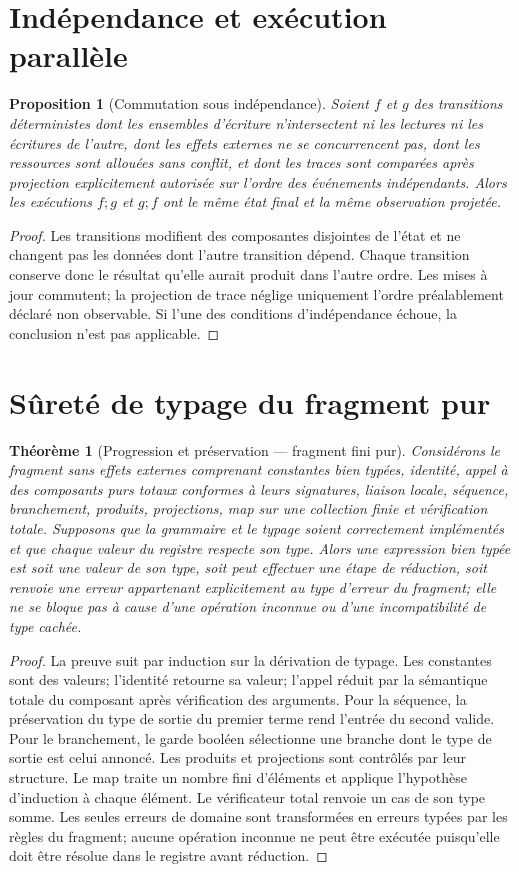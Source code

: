 \documentclass[11pt,a4paper,openany]{book}
\theoremstyle{definition}
\theoremstyle{plain}
\newtheorem{theorem}[definition]{Théorème}
\newtheorem{proposition}[definition]{Proposition}
\theoremstyle{remark}
\begin{document}
\section{Indépendance et exécution parallèle}
\begin{proposition}[Commutation sous indépendance]
Soient $f$ et $g$ des transitions déterministes dont les ensembles d'écriture n'intersectent ni les lectures ni les écritures de l'autre, dont les effets externes ne se concurrencent pas, dont les ressources sont allouées sans conflit, et dont les traces sont comparées après projection explicitement autorisée sur l'ordre des événements indépendants. Alors les exécutions $f;g$ et $g;f$ ont le même état final et la même observation projetée.
\end{proposition}
\begin{proof}
Les transitions modifient des composantes disjointes de l'état et ne changent pas les données dont l'autre transition dépend. Chaque transition conserve donc le résultat qu'elle aurait produit dans l'autre ordre. Les mises à jour commutent; la projection de trace néglige uniquement l'ordre préalablement déclaré non observable. Si l'une des conditions d'indépendance échoue, la conclusion n'est pas applicable.
\end{proof}

\section{Sûreté de typage du fragment pur}
\begin{theorem}[Progression et préservation — fragment fini pur]
Considérons le fragment sans effets externes comprenant constantes bien typées, identité, appel à des composants purs totaux conformes à leurs signatures, liaison locale, séquence, branchement, produits, projections, map sur une collection finie et vérification totale. Supposons que la grammaire et le typage soient correctement implémentés et que chaque valeur du registre respecte son type. Alors une expression bien typée est soit une valeur de son type, soit peut effectuer une étape de réduction, soit renvoie une erreur appartenant explicitement au type d'erreur du fragment; elle ne se bloque pas à cause d'une opération inconnue ou d'une incompatibilité de type cachée.
\end{theorem}
\begin{proof}
La preuve suit par induction sur la dérivation de typage. Les constantes sont des valeurs; l'identité retourne sa valeur; l'appel réduit par la sémantique totale du composant après vérification des arguments. Pour la séquence, la préservation du type de sortie du premier terme rend l'entrée du second valide. Pour le branchement, le garde booléen sélectionne une branche dont le type de sortie est celui annoncé. Les produits et projections sont contrôlés par leur structure. Le map traite un nombre fini d'éléments et applique l'hypothèse d'induction à chaque élément. Le vérificateur total renvoie un cas de son type somme. Les seules erreurs de domaine sont transformées en erreurs typées par les règles du fragment; aucune opération inconnue ne peut être exécutée puisqu'elle doit être résolue dans le registre avant réduction.
\end{proof}
\end{document}
